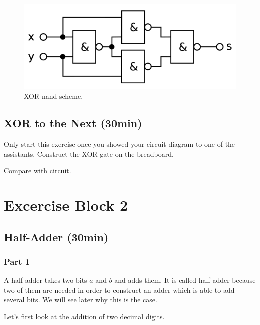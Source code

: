 \documentclass[10pt,a4paper]{article}
\begin{document}
\begin{enumerate}
\begin{figure}[H]
			\centering		  
			\includegraphics[scale=0.3]{xor-nand-scheme}
			\caption{XOR nand scheme.}
			\label{fig:xor-nand-scheme}
		\end{figure}
	\end{enumerate}
	
	\subsection{XOR to the Next (30min)}
	Only start this exercise once you showed your circuit diagram to one of the assistants.
	Construct the XOR gate on the breadboard.
	\begin{center}
		Compare with circuit.
	\end{center}
	\section{Excercise Block 2}
	
	\subsection{Half-Adder (30min)}
	\subsubsection{Part 1}
	A half-adder takes two bits $a$ and $b$ and adds them. It is called half-adder because two of them are needed in order to construct an adder which is able to add several bits. We will see later why this is the case.
	
	Let's first look at the addition of two decimal digits. 
	
\end{document}
